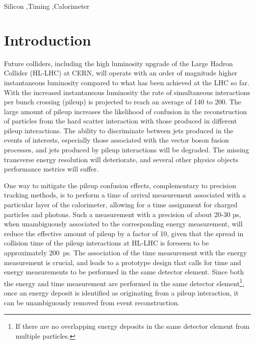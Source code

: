 \documentclass[preprint,1p]{elsarticle}
\begin{document}
\begin{frontmatter}
\begin{abstract}
\end{abstract}

\begin{keyword}

Silicon \sep Timing \sep Calorimeter

\end{keyword}

\end{frontmatter}


\section{Introduction} 

Future colliders, including the high luminosity upgrade of the Large Hadron
Collider (HL-LHC) at CERN, will operate with an order of magnitude higher
instantaneous luminosity compared to what has been achieved at the LHC so far.
With the increased instantaneous luminosity the rate of simultaneous
interactions per bunch crossing (pileup) is projected to reach an average of 140
to 200. The large amount of pileup increases the likelihood of confusion in the
reconstruction of particles from the hard scatter interaction with those
produced in different pileup interactions. The ability to discriminate between
jets produced in the events of interests, especially those associated with the
vector boson fusion processes, and jets produced by pileup interactions will be
degraded. The missing transverse energy resolution will deteriorate, and several
other physics objects performance metrics will suffer.

One way to mitigate the pileup confusion effects, complementary to precision
tracking methods, is to perform a time of arrival measurement associated with a
particular layer of the calorimeter, allowing for a time assignment for 
charged particles and photons. Such a measurement with a precision of about
20-30 ps, when unambiguously associated to the corresponding energy measurement,
will reduce the effective amount of pileup by a factor of 10, given that the
spread in collision time of the pileup interactions at HL-LHC is foreseen to be
approximately 200~ps. The association of the time measurement with the energy
measurement is crucial, and leads to a prototype design that calls for  time
and energy measurements to be performed in the same detector element. Since both
the energy and time measurement are performed in the same detector
element\footnote{If there are no overlapping energy deposits in the same
detector element from multiple particles.}, once
an energy deposit is identified as originating from a pileup interaction, it can
be unambiguously removed from event reconstruction. 
\end{document}
